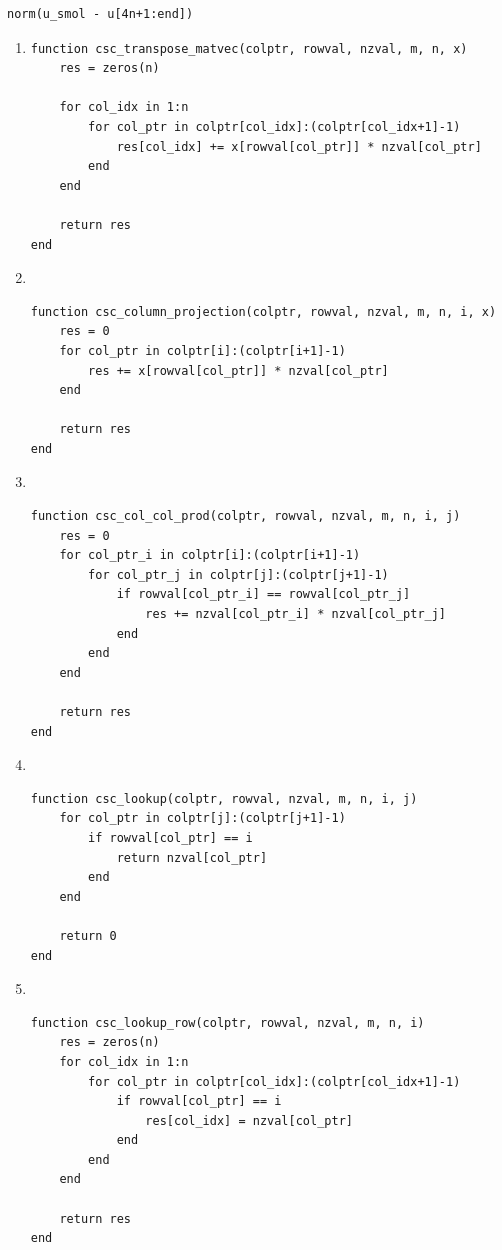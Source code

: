 \documentclass[]{exam}
\begin{document}
\begin{questions}
\begin{enumerate}[label=\arabic*.]
\begin{lstlisting}
norm(u_smol - u[4n+1:end])
		\end{lstlisting}
\end{enumerate}

\newpage
\question
\hfill

\begin{enumerate}[label=\arabic*.]
	\item
		\begin{lstlisting}
function csc_transpose_matvec(colptr, rowval, nzval, m, n, x)
	res = zeros(n)

	for col_idx in 1:n
		for col_ptr in colptr[col_idx]:(colptr[col_idx+1]-1)
			res[col_idx] += x[rowval[col_ptr]] * nzval[col_ptr]
		end
	end

	return res
end
		\end{lstlisting}
	\item ~
		\begin{lstlisting}
function csc_column_projection(colptr, rowval, nzval, m, n, i, x)
	res = 0
	for col_ptr in colptr[i]:(colptr[i+1]-1)
		res += x[rowval[col_ptr]] * nzval[col_ptr]
	end

	return res
end
		\end{lstlisting}
	\item ~
		\begin{lstlisting}
function csc_col_col_prod(colptr, rowval, nzval, m, n, i, j)
	res = 0
	for col_ptr_i in colptr[i]:(colptr[i+1]-1)
		for col_ptr_j in colptr[j]:(colptr[j+1]-1)
			if rowval[col_ptr_i] == rowval[col_ptr_j]
				res += nzval[col_ptr_i] * nzval[col_ptr_j]
			end
		end
	end

	return res
end
		\end{lstlisting}
	\item ~
		\begin{lstlisting}
function csc_lookup(colptr, rowval, nzval, m, n, i, j)
	for col_ptr in colptr[j]:(colptr[j+1]-1)
		if rowval[col_ptr] == i
			return nzval[col_ptr]
		end
	end

	return 0
end
		\end{lstlisting}
	\item ~
		\begin{lstlisting}
function csc_lookup_row(colptr, rowval, nzval, m, n, i)
	res = zeros(n)
	for col_idx in 1:n
		for col_ptr in colptr[col_idx]:(colptr[col_idx+1]-1)
			if rowval[col_ptr] == i
				res[col_idx] = nzval[col_ptr]
			end
		end
	end

	return res
end
		\end{lstlisting}
\end{enumerate}

\end{questions}
\end{document}
